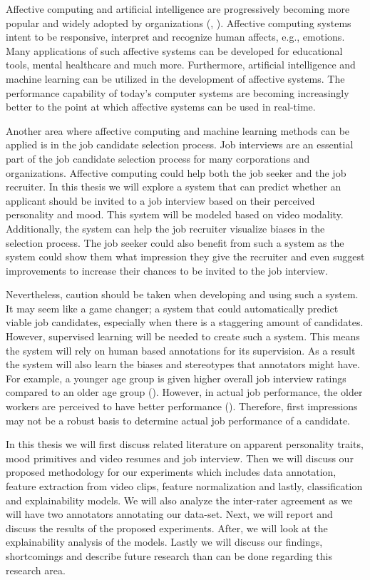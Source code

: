 Affective computing and artificial intelligence are progressively becoming more popular and widely adopted by organizations (\cite{davenport2018artificial}, \cite{tao2005affective}). Affective computing systems intent to be responsive, interpret and recognize human affects, e.g., emotions. Many applications of such affective systems can be developed for educational tools, mental healthcare and much more. Furthermore, artificial intelligence and machine learning can be utilized in the development of affective systems. The performance capability of today's computer systems are becoming increasingly better to the point at which affective systems can be used in real-time. 

Another area where affective computing and machine learning methods can be applied is in the job candidate selection process. Job interviews are an essential part of the job candidate selection process for many corporations and organizations. Affective computing could help both the job seeker and the job recruiter. In this thesis we will explore a system that can predict whether an applicant should be invited to a job interview based on their perceived personality and mood. This system will be modeled based on video modality. Additionally, the system can help the job recruiter visualize biases in the selection process. The job seeker could also benefit from such a system as the system could show them what impression they give the recruiter and even suggest improvements to increase their chances to be invited to the job interview. 

Nevertheless, caution should be taken when developing and using such a system. It may seem like a game changer; a system that could automatically predict viable job candidates, especially when there is a staggering amount of candidates. However, supervised learning will be needed to create such a system. This means the system will rely on human based annotations for its supervision. As a result the system will also learn the biases and stereotypes that annotators might have. For example, a younger age group is given higher overall job interview ratings compared to an older age group (\cite{morgeson2008review}). However, in actual job performance, the older workers are perceived to have better performance (\cite{truxillo2012perceptions}). Therefore, first impressions may not be a robust basis to determine actual job performance of a candidate.

In this thesis we will first discuss related literature on apparent personality traits, mood primitives and video resumes and job interview. Then we will discuss our proposed methodology for our experiments which includes data annotation, feature extraction from video clips, feature normalization and lastly, classification and explainability models. We will also analyze the inter-rater agreement as we will have two annotators annotating our data-set. Next, we will report and discuss the results of the proposed experiments. After, we will look at the explainability analysis of the models. Lastly we will discuss our findings, shortcomings and describe future research than can be done regarding this research area. 
